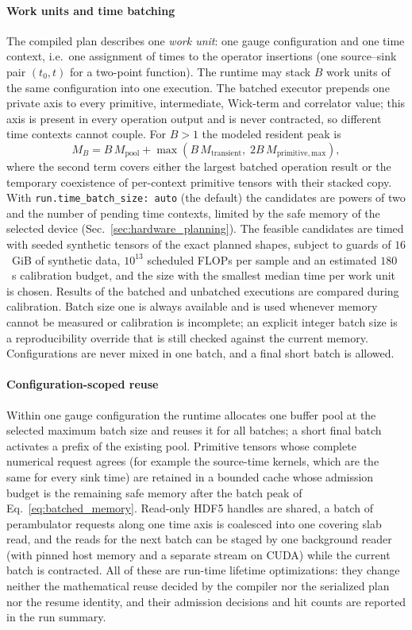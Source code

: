 \documentclass[a4paper,fleqn]{cas-dc}
\begin{document}
\paragraph{Work units and time batching}
The compiled plan describes one \emph{work unit}: one gauge configuration and
one time context, i.e.\ one assignment of times to the operator insertions (one
source--sink pair \((t_0,t)\) for a two-point function). The runtime may stack
\(B\) work units of the same configuration into one execution. The batched
executor prepends one private axis to every primitive, intermediate, Wick-term
and correlator value; this axis is present in every operation output and is never
contracted, so different time contexts cannot couple. For \(B>1\) the modeled
resident peak is
\begin{equation}
M_B = B\,M_{\mathrm{pool}}
 + \max\!\left(B\,M_{\mathrm{transient}},\; 2B\,M_{\mathrm{primitive,max}}\right),
\label{eq:batched_memory}
\end{equation}
where the second term covers either the largest batched operation result or the
temporary coexistence of per-context primitive tensors with their stacked copy.
With \texttt{run.time\_batch\_size: auto} (the default) the candidates are powers
of two and the number of pending time contexts, limited by the safe memory of the
selected device (Sec.~\ref{sec:hardware_planning}). The feasible candidates are
timed with seeded synthetic tensors of the exact planned shapes, subject to
guards of \(16\)~GiB of synthetic data, \(10^{13}\) scheduled FLOPs per sample and
an estimated \(180\)~s calibration budget, and the size with the smallest median
time per work unit is chosen. Results of the batched and unbatched executions are
compared during calibration. Batch size one is always available and is used
whenever memory cannot be measured or calibration is incomplete; an explicit
integer batch size is a reproducibility override that is still checked against
the current memory. Configurations are never mixed in one batch, and a final
short batch is allowed.

\paragraph{Configuration-scoped reuse}
Within one gauge configuration the runtime allocates one buffer pool at the
selected maximum batch size and reuses it for all batches; a short final batch
activates a prefix of the existing pool. Primitive tensors whose complete
numerical request agrees (for example the source-time kernels, which are the
same for every sink time) are retained in a bounded cache whose admission budget
is the remaining safe memory after the batch peak of Eq.~\eqref{eq:batched_memory}.
Read-only HDF5 handles are shared, a batch of perambulator requests along one
time axis is coalesced into one covering slab read, and the reads for the next
batch can be staged by one background reader (with pinned host memory and a
separate stream on CUDA) while the current batch is contracted. All of these are
run-time lifetime optimizations: they change neither the mathematical reuse
decided by the compiler nor the serialized plan nor the resume identity, and
their admission decisions and hit counts are reported in the run summary.
\end{document}
